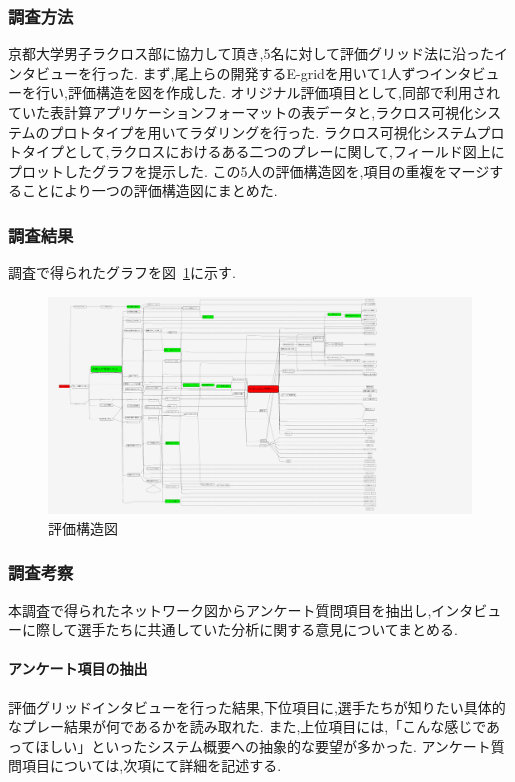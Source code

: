 \documentclass[sotsuron]{kuee}
\begin{document}
			\subsubsection{調査方法}
				京都大学男子ラクロス部に協力して頂き,5名に対して評価グリッド法に沿ったインタビューを行った.  
				まず,尾上らの開発するE-gridを用いて1人ずつインタビューを行い,評価構造を図を作成した.  
				オリジナル評価項目として,同部で利用されていた表計算アプリケーションフォーマットの表データと,ラクロス可視化システムのプロトタイプを用いてラダリングを行った.  
				ラクロス可視化システムプロトタイプとして,ラクロスにおけるある二つのプレーに関して,フィールド図上にプロットしたグラフを提示した.  
				この5人の評価構造図を,項目の重複をマージすることにより一つの評価構造図にまとめた. 
			\subsubsection{調査結果}	
				調査で得られたグラフを図~\ref{fig:egrid}に示す. 
					\begin{figure}
						\begin{center}
							\includegraphics[width=\linewidth,angle=90]{./png/egrid.png}
						\end{center}
						\caption{評価構造図}
				  		\label{fig:egrid}
					\end{figure}
			\subsubsection{調査考察}
				本調査で得られたネットワーク図からアンケート質問項目を抽出し,インタビューに際して選手たちに共通していた分析に関する意見についてまとめる. 
				\paragraph{アンケート項目の抽出}
					評価グリッドインタビューを行った結果,下位項目に,選手たちが知りたい具体的なプレー結果が何であるかを読み取れた. 
					また,上位項目には,「こんな感じであってほしい」といったシステム概要への抽象的な要望が多かった. 
					アンケート質問項目については,次項にて詳細を記述する. 
\end{document}
